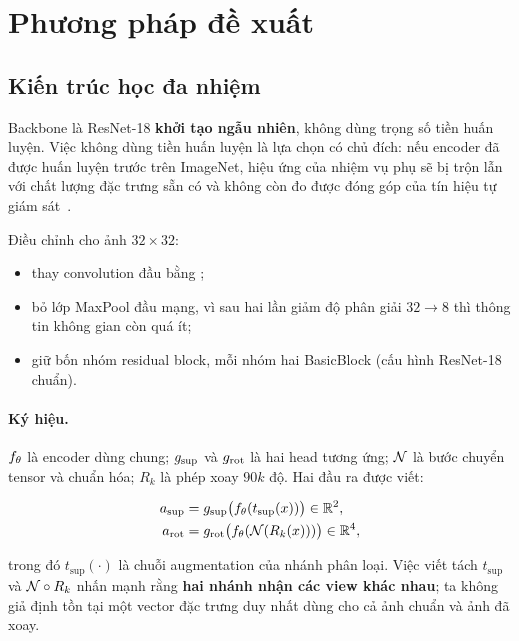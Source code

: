 \section{Phương pháp đề xuất}
\label{sec:method}

\subsection{Kiến trúc học đa nhiệm}
\label{sec:arch}

Backbone là ResNet-18 \textbf{khởi tạo ngẫu nhiên}, không dùng trọng số tiền huấn luyện. Việc
không dùng tiền huấn luyện là lựa chọn có chủ đích: nếu encoder đã được huấn luyện trước trên
ImageNet, hiệu ứng của nhiệm vụ phụ sẽ bị trộn lẫn với chất lượng đặc trưng sẵn có và không
còn đo được đóng góp của tín hiệu tự giám sát~\cite{he2016resnet,pytorch_resnet}.

Điều chỉnh cho ảnh $32 \times 32$:
\begin{itemize}[leftmargin=1.2cm,itemsep=2pt]
  \item thay convolution đầu bằng ;
  \item bỏ lớp MaxPool đầu mạng, vì sau hai lần giảm độ phân giải $32 \to 8$ thì thông tin
        không gian còn quá ít;
  \item giữ bốn nhóm residual block, mỗi nhóm hai BasicBlock (cấu hình ResNet-18 chuẩn).
\end{itemize}



\paragraph{Ký hiệu.}
$f_{\theta}$ là encoder dùng chung; $g_{\mathrm{sup}}$ và $g_{\mathrm{rot}}$ là hai head tương ứng; $\mathcal{N}$ là bước chuyển
tensor và chuẩn hóa; $R_k$ là phép xoay $90k$ độ. Hai đầu ra được viết:

\begin{align}
  a_{\mathrm{sup}} &= g_{\mathrm{sup}}\bigl(f_{\theta}(t_{\mathrm{sup}}(x))\bigr) \in \mathbb{R}^2, \label{eq:asup}\\
  a_{\mathrm{rot}} &= g_{\mathrm{rot}}\bigl(f_{\theta}(\mathcal{N}(R_k(x)))\bigr) \in \mathbb{R}^4, \label{eq:arot}
\end{align}

trong đó $t_{\mathrm{sup}}(\cdot)$ là chuỗi augmentation của nhánh phân loại. Việc viết tách
$t_{\mathrm{sup}}$ và $\mathcal{N} \circ R_k$ nhấn mạnh rằng \textbf{hai nhánh nhận các view khác
nhau}; ta không giả định tồn tại một vector đặc trưng duy nhất dùng cho cả ảnh chuẩn và ảnh đã
xoay.

